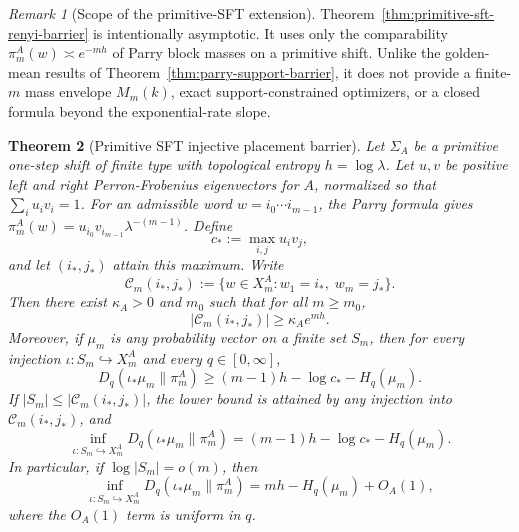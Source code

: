 \documentclass[11pt,letterpaper]{article}
\numberwithin{equation}{section}
\theoremstyle{plain}
\newtheorem{theorem}{Theorem}[section]
\theoremstyle{definition}
\theoremstyle{remark}
\newtheorem{remark}[theorem]{Remark}
\begin{document}
\begin{remark}[Scope of the primitive-SFT extension]
\label{rem:primitive-sft-no-finite-m-claim}
Theorem~\ref{thm:primitive-sft-renyi-barrier} is intentionally asymptotic. It
uses only the comparability \(\pi_m^A(w)\asymp e^{-mh}\) of Parry block masses
on a primitive shift. Unlike the golden-mean results of
Theorem~\ref{thm:parry-support-barrier}, it does not provide a finite-\(m\)
mass envelope \(M_m(k)\), exact support-constrained optimizers, or a closed
formula beyond the exponential-rate slope.
\end{remark}

\begin{theorem}[Primitive SFT injective placement barrier]
\label{thm:primitive-sft-injective-barrier}
Let \(\Sigma_A\) be a primitive one-step shift of finite type with topological
entropy \(h=\log\lambda\). Let \(u,v\) be positive left and right
Perron-Frobenius eigenvectors for \(A\), normalized so that
\(\sum_i u_i v_i=1\). For an admissible word \(w=i_0\cdots i_{m-1}\), the
Parry formula gives
\(\pi_m^A(w)=u_{i_0}v_{i_{m-1}}\lambda^{-(m-1)}\). Define
\[
c_*:=\max_{i,j}u_i v_j,
\]
and let \((i_*,j_*)\) attain this maximum. Write
\[
\mathcal C_m(i_*,j_*):=\{w\in X_m^A: w_1=i_*,\;w_m=j_*\}.
\]
Then there exist \(\kappa_A>0\) and \(m_0\) such that for all \(m\ge m_0\),
\[
|\mathcal C_m(i_*,j_*)|\ge \kappa_A e^{mh}.
\]
Moreover, if \(\mu_m\) is any probability vector on a finite set \(S_m\), then
for every injection \(\iota:S_m\hookrightarrow X_m^A\) and every
\(q\in[0,\infty]\),
\[
D_q(\iota_*\mu_m\|\pi_m^A)
\ge
(m-1)h-\log c_*-H_q(\mu_m).
\]
If \(|S_m|\le |\mathcal C_m(i_*,j_*)|\), the lower bound is attained by any
injection into \(\mathcal C_m(i_*,j_*)\), and
\[
\inf_{\iota:S_m\hookrightarrow X_m^A}D_q(\iota_*\mu_m\|\pi_m^A)
=
(m-1)h-\log c_*-H_q(\mu_m).
\]
In particular, if \(\log|S_m|=o(m)\), then
\[
\inf_{\iota:S_m\hookrightarrow X_m^A}D_q(\iota_*\mu_m\|\pi_m^A)
=
mh-H_q(\mu_m)+O_A(1),
\]
where the \(O_A(1)\) term is uniform in \(q\).
\end{theorem}
\end{document}
